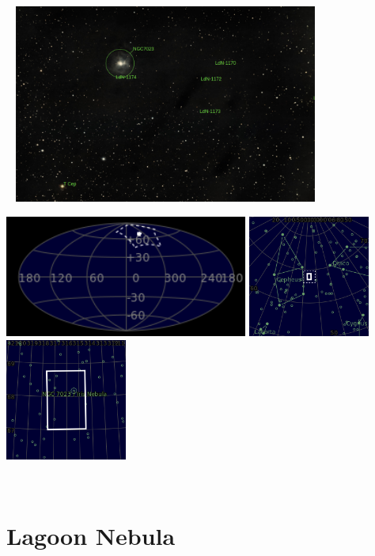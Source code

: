 \begin{center}
 \ \newpage
\includegraphics[width=0.75\textwidth]{../Imaging//Annotated/Iris_Nebula_Annotated.jpg}

\includegraphics[height=4cm]{../Imaging//Annotated/Iris_Nebula_Globe.jpg}
\includegraphics[height=4cm]{../Imaging//Annotated/Iris_Nebula_Close.jpg}
\includegraphics[height=4cm]{../Imaging//Annotated/Iris_Nebula_Closer.jpg}
\end{center}
\ \\\section{Lagoon Nebula}

